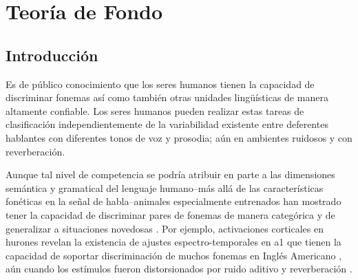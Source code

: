 \chapter{Teoría de Fondo}

\label{ch:background}

\section{Introducción}

Es de público conocimiento que los seres humanos tienen la capacidad de discriminar fonemas así como también otras unidades lingüísticas de manera altamente confiable. Los seres humanos pueden realizar estas tareas de clasificación independientemente de la variabilidad existente entre deferentes hablantes con diferentes tonos de voz y prosodia; aún en ambientes ruidosos y con reverberación.


Aunque tal nivel de competencia se podría atribuir en parte a las dimensiones semántica y gramatical del lenguaje humano--más allá de las características fonéticas en la señal de habla--animales especialmente entrenados han mostrado tener la capacidad de discriminar pares de fonemas de manera categórica y de generalizar a situaciones novedosas \cite{kuhl_1975, kuhl_1983, kluender_1998, pons_2006, hienz_1996, dent_1997, lotto_1997}. Por ejemplo, activaciones corticales en hurones revelan la existencia de ajustes espectro-temporales en \gls{a1} que tienen la capacidad de soportar discriminación de muchos fonemas en Inglés Americano \cite{mesgarani_2008}, aún cuando los estímulos fueron distorsionados por ruido aditivo y reverberación \cite{mesgarani_2014A}.


